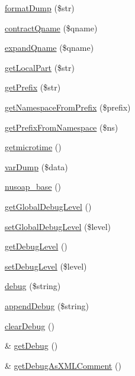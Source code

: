 \begin{DoxyCompactItemize}
\item 
\hyperlink{classnusoap__base_a25b092fe846b5b64eb91f3e69c0135d7}{format\-Dump} (\$str)
\item 
\hyperlink{classnusoap__base_a80d8fbb13c77aa2c9f55412d3ec42b35}{contract\-Qname} (\$qname)
\item 
\hyperlink{classnusoap__base_a4ae2088629a518bce1dcd587493ba1c5}{expand\-Qname} (\$qname)
\item 
\hyperlink{classnusoap__base_ad8a635f36c991a56a1f922bbb4f4b926}{get\-Local\-Part} (\$str)
\item 
\hyperlink{classnusoap__base_a4065364adef252b0f97ae746c4ad04bf}{get\-Prefix} (\$str)
\item 
\hyperlink{classnusoap__base_ac1674cfdd84b7c057f567b5a412765ca}{get\-Namespace\-From\-Prefix} (\$prefix)
\item 
\hyperlink{classnusoap__base_ac61943e23235475161427270581a0b32}{get\-Prefix\-From\-Namespace} (\$ns)
\item 
\hyperlink{classnusoap__base_acdd881f58961544f44bfe96ad57f1299}{getmicrotime} ()
\item 
\hyperlink{classnusoap__base_a072b06434688ac7c909f822ddbb48535}{var\-Dump} (\$data)
\item 
\hyperlink{classnusoap__base_a07443354955c9c613494da2c352f8c6e}{nusoap\-\_\-base} ()
\item 
\hyperlink{classnusoap__base_ace64a2a947aa8b2e41b59676eb3b2c04}{get\-Global\-Debug\-Level} ()
\item 
\hyperlink{classnusoap__base_a11ccf93dc5a46058da219a8dc2a826f1}{set\-Global\-Debug\-Level} (\$level)
\item 
\hyperlink{classnusoap__base_a122db96cedfc221cf187ce4328f992f7}{get\-Debug\-Level} ()
\item 
\hyperlink{classnusoap__base_a5254eafb0d4b255e290f98b186a7036d}{set\-Debug\-Level} (\$level)
\item 
\hyperlink{classnusoap__base_ac652bd9010bd39b0f2854f7ded3f6f33}{debug} (\$string)
\item 
\hyperlink{classnusoap__base_a659455287a25d64cd0bcb0c04ec9d62d}{append\-Debug} (\$string)
\item 
\hyperlink{classnusoap__base_a5b44893b1d018eee5868a29ef790b97a}{clear\-Debug} ()
\item 
\& \hyperlink{classnusoap__base_a4b229e854137bd6ffae366eac8374623}{get\-Debug} ()
\item 
\& \hyperlink{classnusoap__base_a756e9d545f662fdd678613ffdbb8b979}{get\-Debug\-As\-X\-M\-L\-Comment} ()

\end{DoxyCompactItemize}

